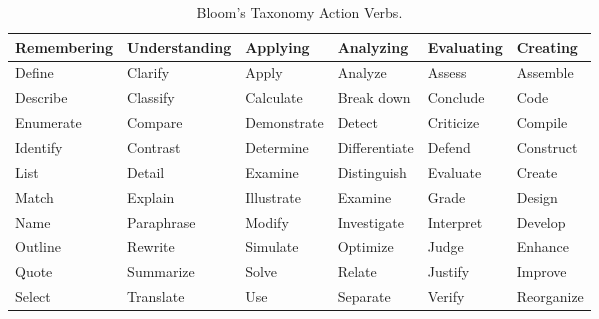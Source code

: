 \begin{table}[htbp]
   \centering
   \renewcommand{\arraystretch}{1.6} %
   \caption{Bloom's Taxonomy Action Verbs.}
   \label{tab:blooms_verbs_columns}
   \begin{tabularx}{\textwidth}{|>{\hsize=1.15\hsize\centering\arraybackslash}X|>{\hsize=1.25\hsize\centering\arraybackslash}X|>{\hsize=0.95\hsize\centering\arraybackslash}X|>{\hsize=0.95\hsize\centering\arraybackslash}X|>{\hsize=0.9\hsize\centering\arraybackslash}X|>{\hsize=0.8\hsize\centering\arraybackslash}X|}
     \hline
     \rowcolor{gray!15}
     \textbf{Remembering} & \textbf{Understanding} & \textbf{Applying} & \textbf{Analyzing} & \textbf{Evaluating} & \textbf{Creating} \\
     \hline
     Define & Clarify & Apply & Analyze & Assess & Assemble \\
     \hline
     Describe & Classify & Calculate & Break down & Conclude & Code \\
     \hline
     Enumerate & Compare & Demonstrate & Detect & Criticize & Compile \\
     \hline
     Identify & Contrast & Determine & Differentiate & Defend & Construct \\
     \hline
     List & Detail & Examine & Distinguish & Evaluate & Create \\
     \hline
     Match & Explain & Illustrate & Examine & Grade & Design \\
     \hline
     Name & Paraphrase & Modify & Investigate & Interpret & Develop \\
     \hline
     Outline & Rewrite & Simulate & Optimize & Judge & Enhance \\
     \hline
     Quote & Summarize & Solve & Relate & Justify & Improve \\
     \hline
     Select & Translate & Use & Separate & Verify & Reorganize \\
     \hline
   \end{tabularx}
 \end{table}


